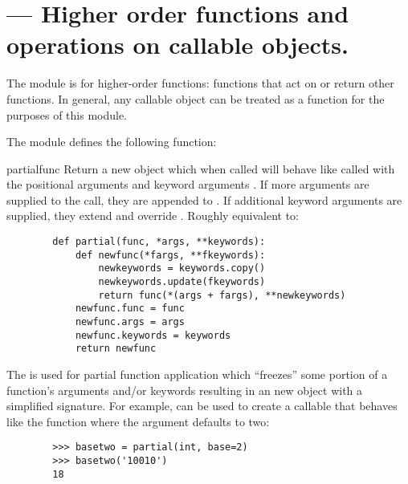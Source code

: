 \section{ ---
         Higher order functions and operations on callable objects.}





The  module is for higher-order functions: functions
that act on or return other functions. In general, any callable object can
be treated as a function for the purposes of this module.


The  module defines the following function:

\begin{funcdesc}{partial}{func}
Return a new  object which when called will behave like
 called with the positional arguments  and keyword
arguments . If more arguments are supplied to the call, they
are appended to . If additional keyword arguments are supplied,
they extend and override . Roughly equivalent to:
  \begin{verbatim}
        def partial(func, *args, **keywords):
            def newfunc(*fargs, **fkeywords):
                newkeywords = keywords.copy()
                newkeywords.update(fkeywords)
                return func(*(args + fargs), **newkeywords)
            newfunc.func = func
            newfunc.args = args
            newfunc.keywords = keywords
            return newfunc
  \end{verbatim}

The  is used for partial function application which
``freezes'' some portion of a function's arguments and/or keywords
resulting in an new object with a simplified signature.  For example,
 can be used to create a callable that behaves like
the  function where the  argument defaults to
two:
  \begin{verbatim}
        >>> basetwo = partial(int, base=2)
        >>> basetwo('10010')
        18
  \end{verbatim}
\end{funcdesc}




